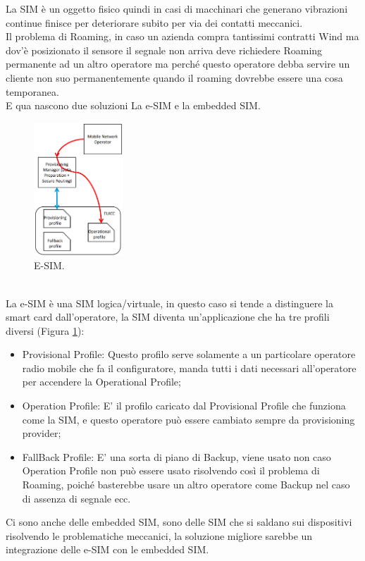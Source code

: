 \documentclass[11pt, twocolumn]{article}
\newenvironment{myitemize}
{ \begin{itemize}[topsep=0ex]
		\setlength{\itemsep}{0pt}
		\setlength{\parskip}{0pt}
		\setlength{\parsep}{0pt}     }
	{ \end{itemize}                  }
\begin{document}
La SIM è un oggetto fisico quindi in casi di macchinari che generano vibrazioni continue finisce per deteriorare subito per via dei contatti meccanici.\\
Il problema di Roaming, in caso un azienda compra  tantissimi contratti Wind ma dov'è posizionato il sensore il segnale non arriva deve richiedere Roaming permanente ad un altro operatore ma perché questo operatore debba servire un cliente non suo permanentemente quando il roaming dovrebbe essere una cosa temporanea.\\
E qua nascono due soluzioni La e-SIM e la embedded SIM. 
\begin{figure}[!h]
  \centering
  \includegraphics[width=\linewidth,height=5cm]{imgs/esim.png}
  \caption{E-SIM.}
  \label{fig:esim}
\end{figure}\\
La e-SIM è una SIM logica/virtuale, in questo caso si tende a distinguere la smart card dall'operatore, la SIM diventa un'applicazione che ha tre profili diversi (Figura \ref{fig:esim}):
\begin{myitemize}
  \item Provisional Profile: Questo profilo serve solamente a un particolare operatore radio mobile che fa il configuratore, manda tutti i dati necessari all'operatore per accendere la Operational Profile;
  \item Operation Profile: E' il profilo caricato dal Provisional Profile che funziona come la SIM, e questo operatore può essere cambiato sempre da provisioning provider;
  \item FallBack Profile: E' una sorta di piano di Backup, viene usato non caso Operation Profile non può essere usato risolvendo così il problema di Roaming, poiché basterebbe usare un altro operatore come Backup nel caso di assenza di segnale ecc.
\end{myitemize}
Ci sono anche delle embedded SIM, sono delle SIM che si saldano sui dispositivi risolvendo le problematiche meccanici, la soluzione migliore sarebbe un integrazione delle e-SIM con le embedded SIM.
\end{document}
